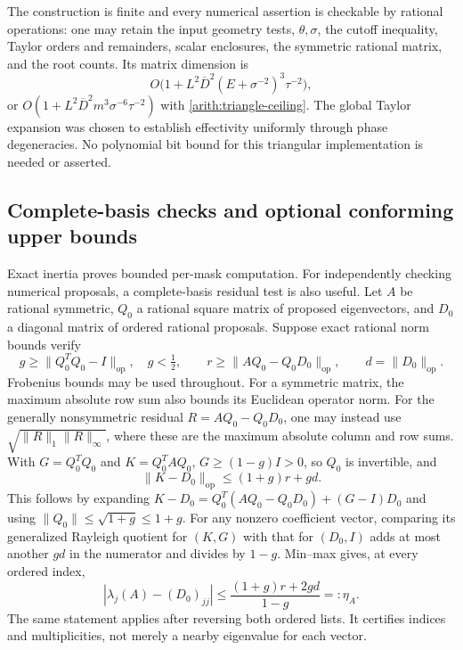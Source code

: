 \documentclass[11pt,reqno]{amsart}
\numberwithin{equation}{section}
\newcommand{\norm}[1]{\lVert#1\rVert}
\begin{document}
The construction is finite and every numerical assertion is
checkable by rational operations: one may retain the input
geometry tests, $\theta,\sigma$, the cutoff inequality,
Taylor orders and remainders, scalar enclosures, the symmetric
rational matrix, and the root counts.  Its matrix dimension is
\[
 O\bigl(1+L^2\overline D^2(E+\sigma^{-2})^3\tau^{-2}\bigr),
\]
or $O(1+L^2\overline D^2m^3\sigma^{-6}\tau^{-2})$ with
\eqref{arith:triangle-ceiling}.  The global Taylor expansion
was chosen to establish effectivity uniformly through phase
degeneracies.  No polynomial bit bound for this triangular
implementation is needed or asserted.

\subsection{Complete-basis checks and optional conforming upper bounds}
\label{arith:proposal-checks}

Exact inertia proves bounded per-mask computation.  For
independently checking numerical proposals, a complete-basis
residual test is also useful.  Let $A$ be rational symmetric,
$Q_0$ a rational square matrix of proposed eigenvectors, and
$D_0$ a diagonal matrix of ordered rational proposals.
Suppose exact rational norm bounds verify
\[
 g\ge\norm{Q_0^TQ_0-I}_{\mathrm{op}},\quad g<\tfrac12,
 \qquad r\ge\norm{AQ_0-Q_0D_0}_{\mathrm{op}},\qquad
 d=\norm{D_0}_{\mathrm{op}}.
\]
Frobenius bounds may be used throughout.  For a symmetric
matrix, the maximum absolute row sum also bounds its Euclidean
operator norm.  For the generally nonsymmetric residual
$R=AQ_0-Q_0D_0$, one may instead use
$\sqrt{\norm R_1\norm R_\infty}$, where these are the maximum
absolute column and row sums.  With $G=Q_0^TQ_0$ and $K=Q_0^TAQ_0$,
$G\ge(1-g)I>0$, so $Q_0$ is invertible, and
\[
 \norm{K-D_0}_{\mathrm{op}}
 \le(1+g)r+gd.
\]
This follows by expanding
$K-D_0=Q_0^T(AQ_0-Q_0D_0)+(G-I)D_0$ and using
$\norm{Q_0}\le\sqrt{1+g}\le1+g$.
For any nonzero coefficient vector, comparing its generalized
Rayleigh quotient for $(K,G)$ with that for $(D_0,I)$ adds
at most another $gd$ in the numerator and divides by
$1-g$.  Min--max gives, at every ordered index,
\begin{equation}\label{arith:complete-basis}
 |\lambda_j(A)-(D_0)_{jj}|
 \le\frac{(1+g)r+2gd}{1-g}=:\eta_A .
\end{equation}
The same statement applies after reversing both ordered lists.
It certifies indices and multiplicities, not merely a nearby
eigenvalue for each vector.
\end{document}
